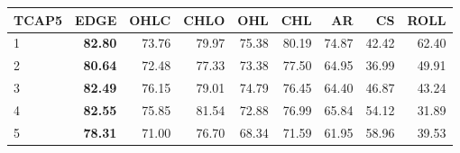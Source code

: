\begin{table}[ht]
\centering
\begin{tabular}{lrrrrrrrr}
  \hline
TCAP5 & EDGE & OHLC & CHLO & OHL & CHL & AR & CS & ROLL \\ 
  \hline
1 & \textbf{82.80} & 73.76 & 79.97 & 75.38 & 80.19 & 74.87 & 42.42 & 62.40 \\ 
  2 & \textbf{80.64} & 72.48 & 77.33 & 73.38 & 77.50 & 64.95 & 36.99 & 49.91 \\ 
  3 & \textbf{82.49} & 76.15 & 79.01 & 74.79 & 76.45 & 64.40 & 46.87 & 43.24 \\ 
  4 & \textbf{82.55} & 75.85 & 81.54 & 72.88 & 76.99 & 65.84 & 54.12 & 31.89 \\ 
  5 & \textbf{78.31} & 71.00 & 76.70 & 68.34 & 71.59 & 61.95 & 58.96 & 39.53 \\ 
   \hline
\end{tabular}
\end{table}
